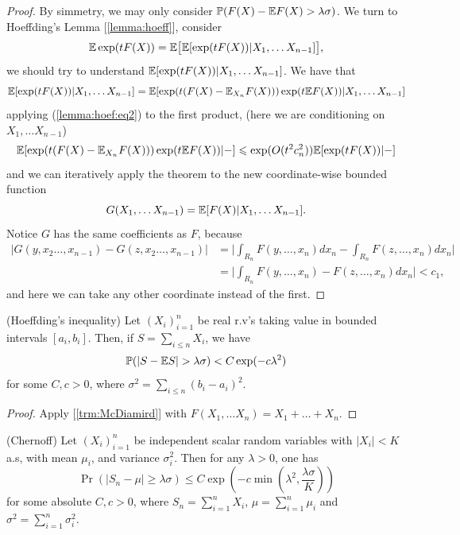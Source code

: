 \begin{proof}
	By simmetry, we may only consider $\mathbb{P}(F(X) - \mathbb{E} F(X) > \lambda
	\sigma)$. We turn to Hoeffding's Lemma [\ref{lemma:hoeff}],
	consider
	\[
		\mathbb{E} \exp(tF(X)) = \mathbb{E} \big[ \mathbb{E}[\exp(tF(X))| X_1, \dots X_{n-1}] \big],
	\]
	we should try to understand $\mathbb{E}[\exp(tF(X))| X_1, \dots X_{n-1}]$.
	We have that
	\[
		\mathbb{E}[\exp(tF(X))| X_1, \dots X_{n-1}] = \mathbb{E}[\exp(t(F(X) -
		\mathbb{E}_{X_n} F(X)))\exp(t\mathbb{E} F(X))| X_1, \dots X_{n-1}]
	\]
	applying (\ref{lemma:hoef:eq2}) to the first product, (here we are
	conditioning on $X_1, \dots X_{n-1}$)
	\[
		\mathbb{E}[\exp(t(F(X) - \mathbb{E}_{X_n}F(X)))\exp(t\mathbb{E} F(X))| - ] \leqslant
		\exp(O(t^2c_n^2))\mathbb{E}[\exp(tF(X)) | -]
	\]
	and we can iteratively apply the theorem to the new coordinate-wise
	bounded function
	\[
		G(X_1, \dots X_{n-1}) = \mathbb{E}[F(X)|X_1, \dots X_{n-1}].
	\]
	Notice $G$ has the same coefficients as $F$, because
	\begin{align*}
		|G(y, x_2 \dots, x_{n-1}) - G(z, x_2 \dots, x_{n-1})| &= \bigg|
		\int_{R_n} F(y,\dots,x_n) dx_n - \int_{R_n} F(z,\dots,x_n) dx_n\bigg|\\
		&= \bigg| \int_{R_n} F(y,\dots,x_n) - F(z,\dots,x_n) dx_n\bigg| < c_1,
	\end{align*}
	and here we can take any other coordinate instead of the first.
\end{proof}

\begin{corollary}
	\label{trm:hoeffding_ineq}
	(Hoeffding's inequality) Let $(X_i)_{i=1}^n$ be real r.v's taking
	value in bounded intervals $[a_i,b_i]$. Then, if $S = \sum_{i \leq
	n} X_i$, we have
	\[
		\mathbb{P}( |S  - \mathbb{E} S| > \lambda\sigma) < C\exp(-c \lambda^2)
	\]
	for some $C,c > 0$, where $\sigma^2 = \sum_{i \leq n} (b_i-a_i)^2$.
\end{corollary}
\begin{proof}
	Apply [\ref{trm:McDiamird}] with $F(X_1, \dots X_n) = X_1 + \dots + X_n$.
\end{proof}

\begin{theorem}
	\label{trm:chernoff} (Chernoff) Let $(X_i)_{i=1}^n$ be independent
	scalar random variables with $|X_i| < K$ a.s,
	with mean $\mu_i$, and variance $\sigma_i^2$. Then for any $\lambda
	> 0$, one has
	\[
		\Pr(|S_n - \mu| \geq \lambda \sigma) \leq C\exp(-c \min(\lambda^2,
		\frac{\lambda \sigma}{K}))
	\]
	for some absolute $C,c > 0$, where $S_n = \sum_{i=1}^{n} X_i$, $\mu
	= \sum_{i=1}^{n} \mu_i$ and $\sigma^2 = \sum_{i=1}^{n} \sigma_i^2$.
\end{theorem}

